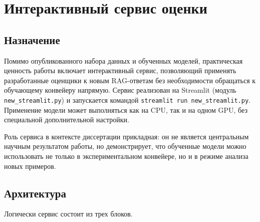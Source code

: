 \section{Интерактивный сервис оценки}
\label{sec:service}

\subsection{Назначение}

Помимо опубликованного набора данных и обученных моделей, практическая ценность работы
включает интерактивный сервис, позволяющий применять разработанные оценщики к новым
RAG-ответам без необходимости обращаться к обучающему конвейеру напрямую. Сервис
реализован на Streamlit (модуль \texttt{new\_streamlit.py}) и запускается командой
\texttt{streamlit run new\_streamlit.py}. Применение модели может выполняться как на CPU, так и
на одном GPU, без специальной дополнительной настройки.

Роль сервиса в контексте диссертации прикладная: он не является центральным научным
результатом работы, но демонстрирует, что обученные модели можно использовать не только
в экспериментальном конвейере, но и в режиме анализа новых примеров.

\subsection{Архитектура}

Логически сервис состоит из трех блоков.

